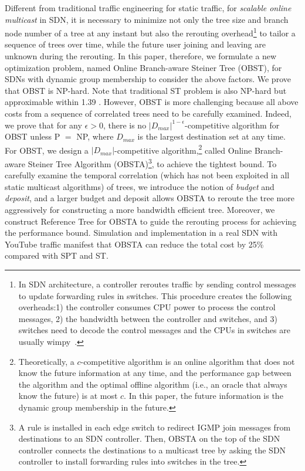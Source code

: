 \documentclass[10pt, conference, letterpaper]{IEEEtran}
\theoremstyle{definition}
\newcounter{procedure}
\begin{document}
Different from traditional traffic engineering for static traffic, for \emph{scalable online multicast} in SDN, it is necessary to minimize not only the tree size and branch node number of a tree at any instant but also the rerouting overhead\footnote{{\color{black}In SDN architecture, a controller reroutes traffic by sending control messages to update forwarding rules in switches. This procedure creates the following overheads:1) the controller consumes CPU power to process the control messages, 2) the bandwidth between the controller and switches, and 3) switches need to decode the control messages and the CPUs in switches are usually wimpy~\cite{devoflow}.}} to tailor a sequence of trees over time, while the future user joining and leaving are unknown during the rerouting. In this paper, therefore, we formulate a new optimization problem, named Online Branch-aware Steiner Tree (OBST), for SDNs with dynamic group membership to consider the above factors. We prove that OBST is NP-hard. Note that traditional ST problem is also NP-hard but approximable within 1.39 \cite{SteinerTreeBestRatio}. However, OBST is more challenging because all above costs from a sequence of correlated trees need to be carefully examined. Indeed, we prove that for any $\epsilon >0$, there is no $|D_{max}|^{1-\epsilon}$-competitive algorithm for OBST unless P $=$ NP, where $D_{max}$ is the largest destination set at any time. For OBST, we design a $|D_{max}|$-competitive algorithm,\footnote{Theoretically, a 
$c$-competitive algorithm \cite{OnlineCompetitiveAnalsis} is an online algorithm that does not know the future information at any time, and the performance gap between the algorithm and the optimal offline algorithm (i.e., an oracle that always know the future) is at most
$c$. In this paper, the future information is the dynamic group membership in the future.} called Online Branch-aware Steiner Tree Algorithm (OBSTA)\footnote{{\color{black}A rule is installed in each edge switch to redirect IGMP join messages from destinations to an SDN controller. Then, OBSTA on the top of the SDN controller connects the destinations to a multicast tree by asking the SDN controller to install forwarding rules into switches in the tree.}}, to achieve the tightest bound. To carefully examine the temporal correlation (which has not been exploited in all static multicast algorithms) of trees, we introduce the notion of \emph{budget} and \emph{deposit}, and a larger budget and deposit allows OBSTA to reroute the tree more aggressively for constructing a more bandwidth efficient tree. Moreover, we construct Reference Tree for OBSTA to guide the rerouting process for achieving the performance bound. {\color{black}Simulation and implementation in a real SDN with YouTube traffic manifest that}
OBSTA can reduce the total cost by 25\% compared with SPT and ST.
\end{document}
